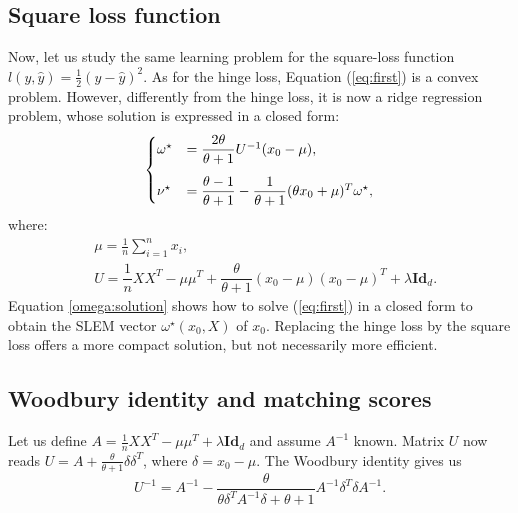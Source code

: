 \subsection{Square loss function}\label{SLEM}
Now, let us study the same learning problem for the square-loss function $l(y,\hat{y}) = \frac{1}{2}(y-\hat{y})^2$. As for the hinge loss, Equation (\ref{eq:first}) is a convex problem. 
However, differently from the hinge loss, it is now a ridge regression problem, whose solution is expressed in a closed form:
\begin{align}
\begin{cases}
\vspace{3 mm}
\omega^\star &= \dfrac{2\theta}{\theta+1}U^{-1}(x_0-\mu), \\
\nu^\star &= \dfrac{\theta-1}{\theta+1}-\dfrac{1}{\theta+1}(\theta x_0+\mu)^T\omega^\star,
\end{cases}
\label{omega:solution}
\end{align}
where:
\begin{align}
&\mu = \frac{1}{n}\sum_{i=1}^n x_i,\\
&U = \dfrac{1}{n}XX^T-\mu\mu^T+\dfrac{\theta}{\theta+1}(x_0-\mu)(x_0-\mu)^T+\lambda\textbf{Id}_d. \label{eq:U}
\end{align}
Equation \ref{omega:solution} shows how to solve (\ref{eq:first}) in a closed form to obtain the SLEM vector $\omega^\star(x_0,X)$ of $x_0$. 
Replacing the hinge loss by the square loss offers a more compact solution, but not necessarily more efficient.

\subsection{Woodbury identity and matching scores}
Let us define $A = \frac{1}{n}XX^T-\mu\mu^T +\lambda\textbf{Id}_d$ and assume $A^{-1}$ known. 
Matrix $U$ now reads $U = A + \frac{\theta}{\theta+1}\delta\delta^T$, where $\delta=x_0-\mu$. The Woodbury identity \cite{woodbury} gives us
\begin{equation}
U^{-1} = A^{-1} -\dfrac{\theta}{\theta\delta^TA^{-1}\delta+ \theta+1}A^{-1}\delta^T\delta A^{-1}. \label{invU}
\end{equation}

